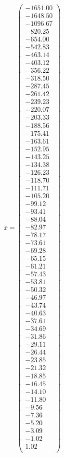 \documentclass[a4paper,12pt]{article}
\begin{document}
$\bar { x } = \begin{pmatrix}
-1651.00 \\
-1648.50 \\
-1096.67 \\
-820.25 \\
-654.00 \\
-542.83 \\
-463.14 \\
-403.12 \\
-356.22 \\
-318.50 \\
-287.45 \\
-261.42 \\
-239.23 \\
-220.07 \\
-203.33 \\
-188.56 \\
-175.41 \\
-163.61 \\
-152.95 \\
-143.25 \\
-134.38 \\
-126.23 \\
-118.70 \\
-111.71 \\
-105.20 \\
-99.12 \\
-93.41 \\
-88.04 \\
-82.97 \\
-78.17 \\
-73.61 \\
-69.28 \\
-65.15 \\
-61.21 \\
-57.43 \\
-53.81 \\
-50.32 \\
-46.97 \\
-43.74 \\
-40.63 \\
-37.61 \\
-34.69 \\
-31.86 \\
-29.11 \\
-26.44 \\
-23.85 \\
-21.32 \\
-18.85 \\
-16.45 \\
-14.10 \\
-11.80 \\
-9.56 \\
-7.36 \\
-5.20 \\
-3.09 \\
-1.02 \\
1.02 \\
\end{pmatrix}
$
\end{document}

